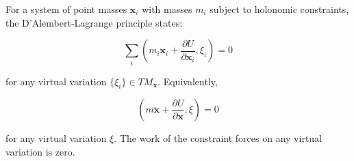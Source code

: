 For a system of point masses $\mathbf{x}_i$ with masses $m_i$ subject to holonomic constraints, the D'Alembert-Lagrange principle states:

$$\sum_i \left( m_i \ddot{\mathbf{x}}_i + \frac{\partial U}{\partial \mathbf{x}_i}, \xi_i \right) = 0$$

for any virtual variation $\{\xi_i\} \in TM_{\mathbf{x}}$. Equivalently,

$$\left( m \ddot{\mathbf{x}} + \frac{\partial U}{\partial \mathbf{x}}, \xi \right) = 0$$

for any virtual variation $\xi$. The work of the constraint forces on any virtual variation is zero.
